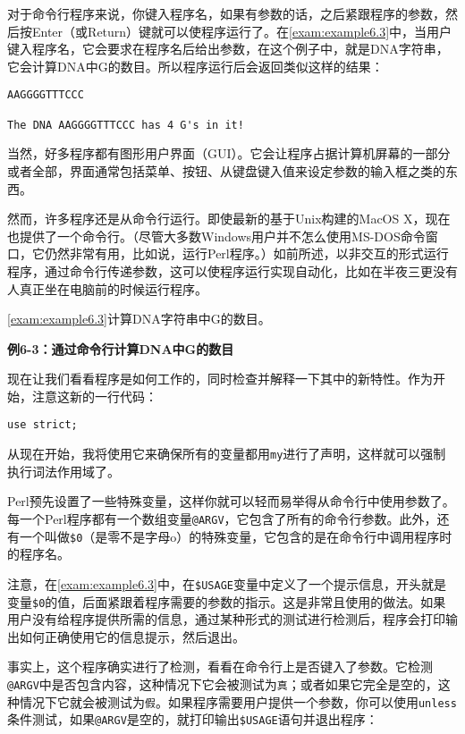对于命令行程序来说，你键入程序名，如果有参数的话，之后紧跟程序的参数，然后按Enter（或Return）键就可以使程序运行了。在\autoref{exam:example6.3}中，当用户键入程序名，它会要求在程序名后给出参数，在这个例子中，就是DNA字符串，它会计算DNA中G的数目。所以程序运行后会返回类似这样的结果：

\begin{lstlisting}
AAGGGGTTTCCC

The DNA AAGGGGTTTCCC has 4 G's in it!
\end{lstlisting}

当然，好多程序都有图形用户界面（GUI）。它会让程序占据计算机屏幕的一部分或者全部，界面通常包括菜单、按钮、从键盘键入值来设定参数的输入框之类的东西。

然而，许多程序还是从命令行运行。即使最新的基于Unix构建的MacOS
X，现在也提供了一个命令行。（尽管大多数Windows用户并不怎么使用MS-DOS命令窗口，它仍然非常有用，比如说，运行Perl程序。）如前所述，以非交互的形式运行程序，通过命令行传递参数，这可以使程序运行实现自动化，比如在半夜三更没有人真正坐在电脑前的时候运行程序。

\autoref{exam:example6.3}计算DNA字符串中G的数目。

\textbf{例6-3：通过命令行计算DNA中G的数目}


现在让我们看看程序是如何工作的，同时检查并解释一下其中的新特性。作为开始，注意这新的一行代码：

\begin{lstlisting}
use strict;
\end{lstlisting}

从现在开始，我将使用它来确保所有的变量都用\verb|my|进行了声明，这样就可以强制执行词法作用域了。

Perl预先设置了一些特殊变量，这样你就可以轻而易举得从命令行中使用参数了。每一个Perl程序都有一个数组变量\verb|@ARGV|，它包含了所有的命令行参数。此外，还有一个叫做\verb|$0|（是零不是字母o）的特殊变量，它包含的是在命令行中调用程序时的程序名。

注意，在\autoref{exam:example6.3}中，在\verb|$USAGE|变量中定义了一个提示信息，开头就是变量\verb|$0|的值，后面紧跟着程序需要的参数的指示。这是非常且使用的做法。如果用户没有给程序提供所需的信息，通过某种形式的测试进行检测后，程序会打印输出如何正确使用它的信息提示，然后退出。

事实上，这个程序确实进行了检测，看看在命令行上是否键入了参数。它检测\verb|@ARGV|中是否包含内容，这种情况下它会被测试为\verb|真|；或者如果它完全是空的，这种情况下它就会被测试为\verb|假|。如果程序需要用户提供一个参数，你可以使用\verb|unless|条件测试，如果\verb|@ARGV|是空的，就打印输出\verb|$USAGE|语句并退出程序：

